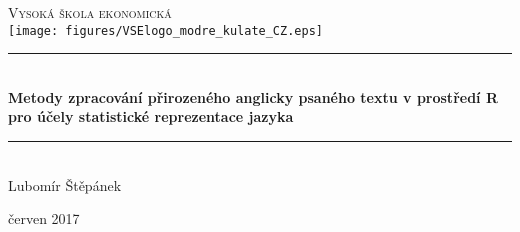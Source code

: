 
\begin{titlepage}
\begin{center}

\textsc{\Large Vysoká škola ekonomická} \\ [1.5cm]

\texttt{[image: figures/VSElogo\_modre\_kulate\_CZ.eps]} \\ [1.5cm]

\rule{\linewidth}{0.5mm} \\ [0.4cm]
{\LARGE \bfseries %
    Metody zpracování přirozeného anglicky psaného textu %
	v prostředí \textsf{R} %
	pro účely statistické reprezentace jazyka%
\\ [0.4cm]}
\rule{\linewidth}{0.5mm} \\ [1.5cm]

\noindent
{\large Lubomír Štěpánek}

\vfill

{\large červen 2017}

\end{center}
\end{titlepage}







